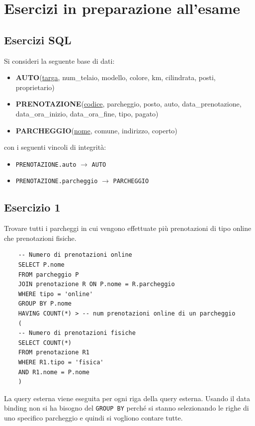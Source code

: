 \section{Esercizi in preparazione all'esame}
\subsection{Esercizi SQL}
Si consideri la seguente base di dati:

\begin{itemize}
	\item \textbf{AUTO}(\underline{targa}, num\_telaio, modello, colore, km, cilindrata, posti, proprietario)
	\item \textbf{PRENOTAZIONE}(\underline{codice}, parcheggio, posto, auto, data\_prenotazione, data\_ora\_inizio, data\_ora\_fine, tipo, pagato)
	\item \textbf{PARCHEGGIO}(\underline{nome}, comune, indirizzo, coperto)
\end{itemize}

con i seguenti vincoli di integrità:

\begin{itemize}
	\item \texttt{PRENOTAZIONE.auto} $\rightarrow$ \texttt{AUTO}
	\item \texttt{PRENOTAZIONE.parcheggio} $\rightarrow$ \texttt{PARCHEGGIO}
\end{itemize}

\subsection{Esercizio 1}

Trovare tutti i parcheggi in cui vengono effettuate più prenotazioni di tipo online che prenotazioni fisiche.

\begin{verbatim}
	-- Numero di prenotazioni online
	SELECT P.nome
	FROM parcheggio P
	JOIN prenotazione R ON P.nome = R.parcheggio
	WHERE tipo = 'online'
	GROUP BY P.nome
	HAVING COUNT(*) > -- num prenotazioni online di un parcheggio
	(
	-- Numero di prenotazioni fisiche
	SELECT COUNT(*)
	FROM prenotazione R1
	WHERE R1.tipo = 'fisica'
	AND R1.nome = P.nome
	)
\end{verbatim}

La query esterna viene eseguita per ogni riga della query esterna. Usando il data
binding non si ha bisogno del \texttt{GROUP BY} perché si stanno selezionando le righe di uno
specifico parcheggio e quindi si vogliono contare tutte.

